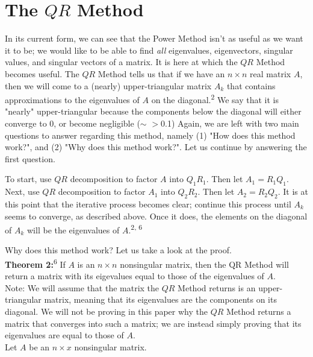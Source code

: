 \documentclass{article}
\begin{document}
\section{The $QR$ Method}
In its current form, we can see that the Power Method isn't as useful as we want it to be; we would like to be able to find \textit{all} eigenvalues, eigenvectors, singular values, and singular vectors of a matrix. It is here at which the $QR$ Method becomes useful. The $QR$ Method tells us that if we have an $n \times n$ real matrix $A$, then we will come to a (nearly) upper-triangular matrix $A_k$ that contains approximations to the eigenvalues of $A$ on the diagonal.\textsuperscript{2} We say that it is "nearly" upper-triangular because the components below the diagonal will either converge to 0, or become negligible ($\sim$  $>$0.1) Again, we are left with two main questions to answer regarding this method, namely (1) "How does this method work?", and (2) "Why does this method work?". Let us continue by answering the first question.
\par To start, use $QR$ decomposition to factor $A$ into $Q_1R_1$. Then let $A_1 = R_1Q_1$. Next, use $QR$ decomposition to factor $A_1$ into $Q_2R_2$. Then let $A_2 = R_2Q_2$. It is at this point that the iterative process becomes clear; continue this process until $A_k$ seems to converge, as described above. Once it does, the elements on the diagonal of $A_k$ will be the eigenvalues of $A$.\textsuperscript{2, 6}
\par Why does this method work? Let us take a look at the proof.\\

\noindent \textbf{Theorem 2:}\textsuperscript{6} If $A$ is an $n \times n$ nonsingular matrix, then the QR Method will return a matrix with its eigevalues equal to those of the eigenvalues of $A$. \\

\noindent Note: We will assume that the matrix the $QR$ Method returns is an upper-triangular matrix, meaning that its eigenvalues are the components on its diagonal. We will not be proving in this paper why the $QR$ Method returns a matrix that converges into such a matrix; we are instead simply proving that its eigenvalues are equal to those of $A$. \\

\noindent Let $A$ be an $n \times x$ nonsingular matrix.
\end{document}
